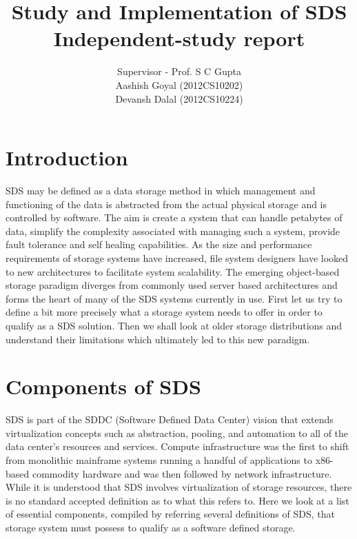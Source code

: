 \documentclass[a4paper,10pt]{article}
\title{ \textbf{Study and Implementation of SDS\\ Independent-study report}}
\author{ Supervisor - Prof. S C Gupta \\
Aashish Goyal (2012CS10202) \\
Devansh Dalal (2012CS10224)  }
\begin{document}
\maketitle


\section{Introduction}
    SDS may be defined as a data storage method in which management and functioning of the data is abstracted from the actual physical storage and is controlled by software. The aim is create a system that can handle petabytes of data, simplify the complexity associated with managing such a system, provide fault tolerance and self healing capabilities. As the size and performance requirements of storage systems have increased, file system designers have looked to new architectures to facilitate system scalability. The emerging object-based storage paradigm diverges from commonly used server based architectures and forms the heart of many of the SDS systems currently in use. First let us try to define a bit more precisely what a storage system needs to offer in order to qualify as a SDS solution. Then we shall look at older storage distributions and understand their limitations which ultimately led to this new paradigm.
    
\section{Components of SDS}
SDS is part of the SDDC (Software Defined Data Center) vision that extends virtualization concepts such as abstraction, pooling, and automation to all of the data center’s resources and services. Compute infrastructure was the first to shift from monolithic mainframe systems running a handful of applications to x86-based commodity hardware and was then followed by network infrastructure. While it is understood that SDS involves virtualization of storage resources, there is no standard accepted definition as to what this refers to. Here we look at a list of essential components, compiled by referring several definitions of SDS, that storage system must possess to qualify as a software defined storage.
\end{document}
